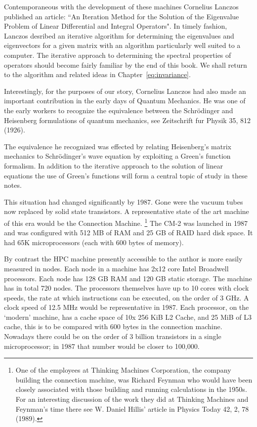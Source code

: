 Contemporaneous with the development of these machines Cornelius Lanczos published
an article: ``An Iteration Method for the Solution of the Eigenvalue Problem of Linear
Differential and Integral Operators"\cite{lanczos50}. In timely fashion, Lanczos desribed 
an iterative algorithm for determining the eigenvalues and eigenvectors for a given
matrix with an algorithm particularly well suited to a computer. 
The iterative approach to determining the spectral properties of operators 
should become fairly familiar by the end of this book. 
We shall return to the algorithm and related ideas in Chapter~\ref{eq:invariance}. 

Interestingly, for the purposes of our story, 
Cornelius Lanczos had also made an important contribution in the early
days of Quantum Mechanics. He was one of the early workers
to recognize the equivalence between the Schr\"odinger and Heisenberg
formulations of quantum mechanics, see Zeitschrift fur Physik 35, 812 (1926). 

The equivalence he recognized was effected by relating Heisenberg's matrix mechanics to
Schr\"odinger's wave equation by exploiting a Green's function formalism. In addition
to the iterative approach to the solution of linear equations the use of Green's functions
will form a central topic of study in these notes.

This situation had changed significantly by 1987. Gone were the vacuum tubes
now replaced by solid state transistors. A representative state of the art
machine of this era would be the Connection Machine.
\footnote{One of the employees at Thinking Machines Corporation,
the company building the connection machine, was Richard Feynman
who would have been closely associated with those building and running
calculations in the 1950s. For an interesting discussion of the work they
did at Thinking Machines and Feynman's time there see W. Daniel
Hillis' article in Physics Today 42, 2, 78 (1989).}
The CM-2 was launched in 1987 and was configured with 512 MB of RAM and 25 GB of RAID
hard disk space. It had 65K microprocessors (each with 600 bytes of memory). 

By contrast the HPC machine presently accessible to the author 
is more easily measured in nodes. Each node in a machine has 2x12 core Intel Broadwell processors.
Each {\emph node} has 128 GB RAM and 120 GB static storage. The machine has in total 720 nodes. 
The processors themselves have up to 10 cores with clock speeds, the rate at which instructions can
be executed, on the order of 3 GHz. A clock speed of 12.5 MHz would be representative in 1987. 
Each processor, on the `modern' machine, has a cache 
space of 10x 256 KiB L2 Cache, and 25 MiB of L3 cache,
this is to be compared with 600 bytes in the connection machine. 
Nowadays there could be on the order of 3 billion transistors in a 
single microprocessor; in 1987 that number would be closer to 100,000. 

